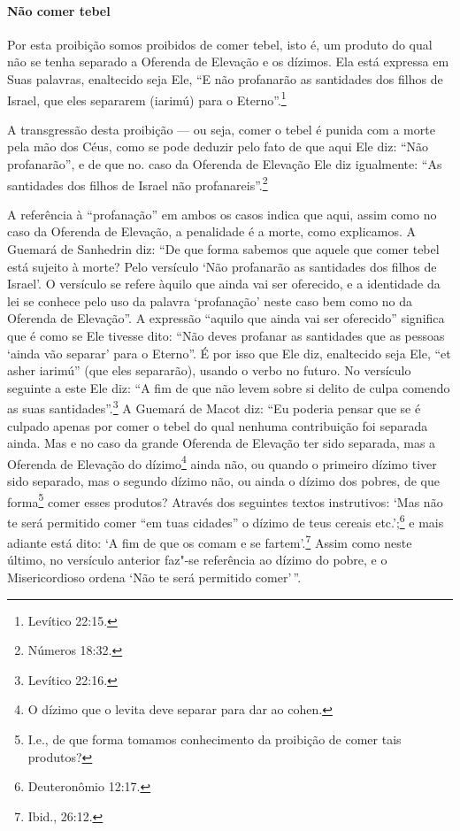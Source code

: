 \begin{multicols}{2}
\paragraph{Não comer tebel\starr}

Por esta proibição somos proibidos de comer tebel\starr, isto é, um
produto do qual não se tenha separado a Oferenda de Elevação e os
dízimos. Ela está expressa em Suas palavras, enaltecido seja Ele, ``E
não profanarão as santidades dos filhos de Israel, que eles separarem
(iarimú\starr) para o Eterno''.\footnote{Levítico 22:15.}

A transgressão desta proibição --- ou seja, comer o tebel\starr{} é punida
com a morte pela mão dos Céus, como se pode deduzir pelo fato de que
aqui Ele diz: ``Não profanarão'', e de que no. caso da Oferenda de
Elevação Ele diz igualmente: ``As santidades dos filhos de Israel não
profanareis''.\footnote{Números 18:32.}

A referência à ``profanação'' em ambos os casos indica que aqui, assim
como no caso da Oferenda de Elevação, a penalidade é a morte, como
explicamos.
A Guemará\starr{} de Sanhedrin\starr{} diz: ``De que forma sabemos que aquele
que comer tebel\starr{} está sujeito à morte? Pelo versículo `Não profanarão
as santidades dos filhos de Israel'. O versículo se refere àquilo que
ainda vai ser oferecido, e a identidade da lei se conhece pelo uso da
palavra `profanação' neste caso bem como no da Oferenda de Elevação''. A
expressão ``aquilo que ainda vai ser oferecido'' significa que é como se
Ele tivesse dito: ``Não deves profanar as santidades que as pessoas
`ainda vão separar' para o Eterno''. É por isso que Ele diz, enaltecido
seja Ele, ``et asher iarimú\starr'' (que eles separarão), usando o verbo no
futuro. No versículo seguinte a este Ele diz: ``A fim de que não levem
sobre si delito de culpa comendo as suas santidades''.\footnote{Levítico 22:16.}
A Guemará\starr{} de Macot\starr{} diz: ``Eu poderia pensar que se é culpado apenas por
comer o tebel\starr{} do qual nenhuma contribuição foi separada ainda. Mas
e no caso da grande Oferenda de Elevação ter sido separada, mas a
Oferenda de Elevação do dízimo\footnote{O dízimo que o levita\starr{} deve separar para dar ao cohen\starr.} ainda não, ou quando o
primeiro dízimo tiver sido separado, mas o segundo dízimo não, ou ainda
o dízimo dos pobres, de que forma\footnote{I.e., de que forma tomamos conhecimento da proibição de comer tais
  produtos?} comer esses
produtos? Através dos seguintes textos instrutivos: `Mas não te será
permitido comer ``em tuas cidades'' o dízimo de teus cereais etc.';\footnote{Deuteronômio 12:17.} e mais adiante está dito: `A fim de que os comam e
se fartem'.\footnote{Ibid., 26:12.} Assim como neste último, no versículo
anterior faz"-se referência ao dízimo do pobre, e o Misericordioso ordena
`Não te será permitido comer'\,''.


\end{multicols}
